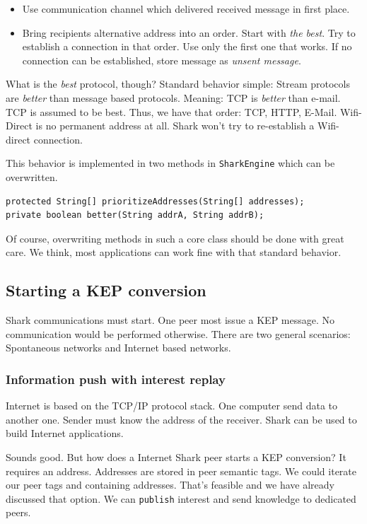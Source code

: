 \begin{itemize}
    \item Use communication channel which delivered received message in first place.
\item
Bring recipients alternative address into an order. Start with {\it the best}. Try to establish a connection in that order. Use only the first one that works. If no connection can be established, store message as {\it unsent message}.
\end{itemize}

What is the {\it best} protocol, though? Standard behavior simple: Stream protocols are {\it better} than message based protocols. Meaning: TCP is {\it better} than e-mail. TCP is assumed to be best. Thus, we have that order: TCP, HTTP, E-Mail. Wifi-Direct is no permanent address at all. Shark won't try to re-establish a Wifi-direct connection.

This behavior is implemented in two methods in {\tt SharkEngine} which can be overwritten.

\begin{verbatim}
protected String[] prioritizeAddresses(String[] addresses);
private boolean better(String addrA, String addrB);
\end{verbatim}

Of course, overwriting methods in such a core class should be done with great care. We think, most applications can work fine with that standard behavior.

\subsection{Starting a KEP conversion}
Shark communications must start. One peer most issue a KEP message. No communication would be performed otherwise. There are two general scenarios: Spontaneous networks and Internet based networks.

\subsubsection{Information push with interest replay}
Internet is based on the TCP/IP protocol stack. One computer send data to another one. Sender must know the address of the receiver. Shark can be used to build Internet applications.

Sounds good. But how does a Internet Shark peer starts a KEP conversion? It requires an address. Addresses are stored in peer semantic tags. We could iterate our peer tags and containing addresses. That's feasible and we have already discussed that option. We can {\tt publish} interest and send knowledge to dedicated peers. 

